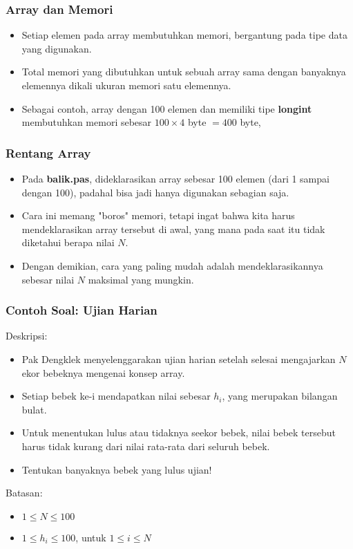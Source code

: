 \documentclass{beamer}
\begin{document}
\begin{frame}
\frametitle{Array dan Memori}
\begin{itemize}
	\item Setiap elemen pada array membutuhkan memori, bergantung pada tipe data yang digunakan.
	\item Total memori yang dibutuhkan untuk sebuah array sama dengan banyaknya elemennya dikali ukuran memori satu elemennya.
	\item Sebagai contoh, array dengan 100 elemen dan memiliki tipe \textbf{longint} membutuhkan memori sebesar $100 \times 4$ byte $= 400$ byte, 
\end{itemize}
\end{frame}

\begin{frame}
\frametitle{Rentang Array}
\begin{itemize}
	\item Pada \textbf{balik.pas}, dideklarasikan array sebesar 100 elemen (dari 1 sampai dengan 100), padahal bisa jadi hanya digunakan sebagian saja.
	\item Cara ini memang "boros" memori, tetapi ingat bahwa kita harus mendeklarasikan array tersebut di awal, yang mana pada saat itu tidak diketahui berapa nilai $N$.
	\item Dengan demikian, cara yang paling mudah adalah mendeklarasikannya sebesar nilai $N$ maksimal yang mungkin.
\end{itemize}
\end{frame}

\begin{frame}
\frametitle{Contoh Soal: Ujian Harian}
Deskripsi:
\begin{itemize}
	\item Pak Dengklek menyelenggarakan ujian harian setelah selesai mengajarkan $N$ ekor bebeknya mengenai konsep array.
	\item Setiap bebek ke-i mendapatkan nilai sebesar \textbf{$h_i$}, yang merupakan bilangan bulat.
	\item Untuk menentukan lulus atau tidaknya seekor bebek, nilai bebek tersebut harus tidak kurang dari nilai rata-rata dari seluruh bebek.
	\item Tentukan banyaknya bebek yang lulus ujian!
\end{itemize}
Batasan:
\begin{itemize}
	\item $1 \le N \le 100$
	\item $1 \le h_i \le 100$, untuk $1 \le i \le N$
\end{itemize}
\end{frame}
\end{document}
